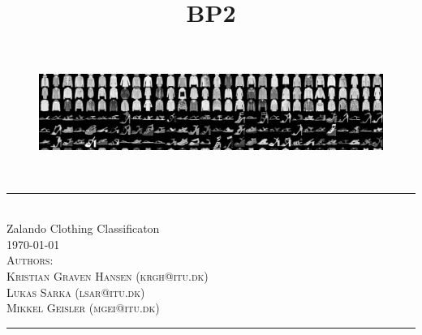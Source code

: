 \title{BP2}
\begin{titlepage}
\centering
\newcommand{\HLine}{\rule{\linewidth}{0.5mm}}

\begin{figure}[h]
\centering
\includegraphics[width=15cm]{figures_for_report/title_photo}
\end{figure}
\hfill \break
\hfill \break
\textsc{\Large}\\
\HLine \\[0.5cm]
\huge Zalando Clothing Classificaton \\
\small{\today}\\
\vspace*{.5cm}
\textsc{\large Authors:
\\Kristian Graven Hansen (krgh@itu.dk)
\\Lukas Sarka (lsar@itu.dk)
\\Mikkel Geisler (mgei@itu.dk)}\\[0.5cm]
\HLine

\begin{minipage}{0.45\textwidth}
\begin{flushleft} \large
\end{flushleft}
\end{minipage}
\begin{minipage}{0.5\textwidth}
\begin{flushright} \large
\end{flushright}
\end{minipage}
\vfill
\end{titlepage}
\pagebreak